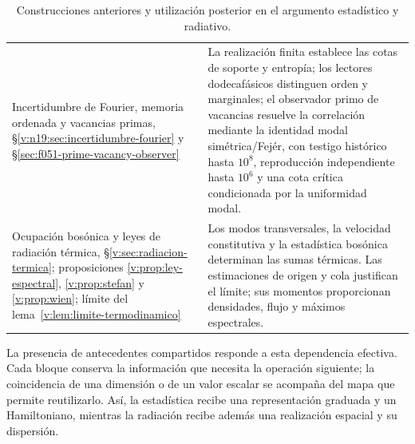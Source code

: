 \begin{table}[H]
\begin{tabularx}{\textwidth}{@{}>{\raggedright\arraybackslash}p{}>{\raggedright\arraybackslash}X@{}}
Incertidumbre de Fourier, memoria ordenada y vacancias primas,
§\ref{v:n19:sec:incertidumbre-fourier} y
§\ref{sec:f051-prime-vacancy-observer}
& La realización finita establece las cotas de soporte y entropía; los
lectores dodecafásicos distinguen orden y marginales; el observador primo
de vacancias resuelve la correlación mediante la identidad modal
simétrica/Fejér, con testigo histórico hasta \(10^8\), reproducción
independiente hasta \(10^6\) y una cota crítica condicionada por la
uniformidad modal. \\
Ocupación bosónica y leyes de radiación térmica,
§\ref{v:sec:radiacion-termica}; proposiciones
\ref{v:prop:ley-espectral}, \ref{v:prop:stefan} y \ref{v:prop:wien};
límite del lema~\ref{v:lem:limite-termodinamico}
& Los modos transversales, la velocidad constitutiva y la estadística
bosónica determinan las sumas térmicas. Las estimaciones de origen y cola
justifican el límite; sus momentos proporcionan densidades, flujo y
máximos espectrales. \\
\bottomrule
\end{tabularx}
\caption{Construcciones anteriores y utilización posterior en el argumento
estadístico y radiativo.}
\label{v:tab:mapa-demostrativo}
\end{table}

La presencia de antecedentes compartidos responde a esta dependencia efectiva.
Cada bloque conserva la información que necesita la operación siguiente;
la coincidencia de una dimensión o de un valor escalar se acompaña del mapa
que permite reutilizarlo. Así, la estadística recibe una representación
graduada y un Hamiltoniano, mientras la radiación recibe además una
realización espacial y su dispersión.

